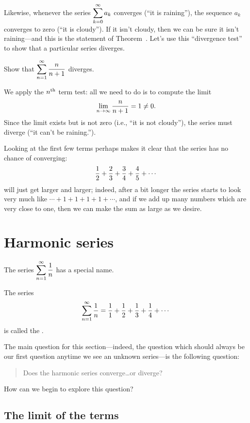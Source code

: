 Likewise, whenever the series $\displaystyle\sum_{k=0}^\infty a_k$ converges
(``it is raining''), the sequence $a_k$ converges to zero (``it is
cloudy'').  If it isn't cloudy, then we can be sure it isn't
raining---and this is the statement of
Theorem~.  Let's use this ``divergence test''
to show that a particular series diverges.
\begin{example}
Show that $\displaystyle\sum_{n=1}^\infty \frac{n}{n+1}$ diverges.
\end{example}

\begin{solution}
We apply the $n^{\mbox{\scriptsize th}}$ term test: all we need to do is to compute the limit
$$\lim _{n\to\infty}{n\over n+1}=1\not=0.$$
Since the limit exists but is not zero (i.e., ``it is not cloudy''),
the series must diverge (``it can't be raining.'').

Looking at the first few terms perhaps makes it clear that the series
has no chance of converging:
$${1\over2}+{2\over3}+{3\over4}+{4\over5}+\cdots$$
will just get larger and larger; indeed, after a bit longer the series
starts to look very much like $\cdots+1+1+1+1+\cdots$, and if we add
up many numbers which are very close to one, then we can make the sum
as large as we desire.
\end{solution}

\section{Harmonic series}
\label{section:harmonic-series}

The series $\displaystyle\sum_{n=1}^\infty {1\over n}$ has a special name.
\begin{definition}
  The series $$\displaystyle\sum_{n=1}^\infty {1\over n} = \frac{1}{1} +
  \frac{1}{2} + \frac{1}{3} + \frac{1}{4} + \cdots$$ is called the
  .
\end{definition}
The main question for this section---indeed, the question which should
always be our first question anytime we see an unknown series---is the
following question:
\begin{quote}
  Does the harmonic series converge\ldots or diverge?
\end{quote}
How can we begin to explore this question?

\subsection{The limit of the terms}

